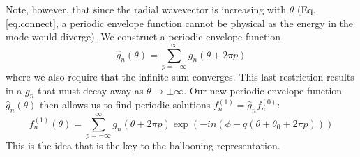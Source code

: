 \documentclass[a4paper,11pt]{article}
\begin{document}

Note, however, that since the radial wavevector is increasing with $\theta$ (Eq. \ref{eq.connect}, a periodic envelope function cannot be physical as the energy in the mode would diverge).  We construct a periodic envelope function
\begin{equation}
  {\hat g}_n(\theta)=\sum_{p=-\infty}^\infty g_{n}(\theta + 2\pi p)
\end{equation}
where we also require that the infinite sum converges.  This last restriction results in a $g_{n}$ that must decay away as $\theta \rightarrow \pm \infty$.  Our new periodic envelope function ${\hat g}_n(\theta)$ then allows us to find periodic solutions $f_n^{(1)}={\hat g}_n f_n^{(0)}$:
\begin{equation}
 f_n^{(1)}(\theta)=\sum_{p=-\infty}^\infty g_{n}(\theta+2\pi p)\exp(-in(\phi-q(\theta+\theta_0+2\pi p))) 
\end{equation}
This is the idea that is the key to the ballooning representation.  


\vspace*{13 pc}

\end{document}
